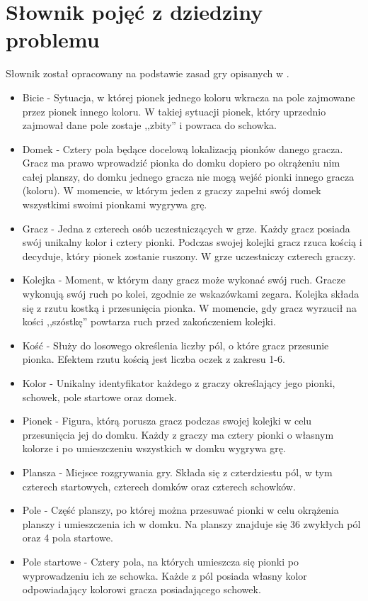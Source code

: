 \documentclass[conference]{IEEEtran}
\begin{document}
\section{Słownik pojęć z dziedziny problemu}
Słownik został opracowany na podstawie zasad gry opisanych w \cite{wiki}.
\begin{itemize}
    \item Bicie - Sytuacja, w której pionek jednego koloru wkracza na pole zajmowane przez pionek innego koloru. W takiej sytuacji pionek, który uprzednio zajmował dane pole zostaje ,,zbity'' i powraca do schowka.
    \item Domek - Cztery pola będące docelową lokalizacją pionków danego gracza. Gracz ma prawo wprowadzić pionka do domku dopiero po okrążeniu nim całej planszy, do domku jednego gracza nie mogą wejść pionki innego gracza (koloru). W momencie, w którym jeden z graczy zapełni swój domek wszystkimi swoimi pionkami wygrywa grę.
    \item Gracz - Jedna z czterech osób uczestniczących w grze. Każdy gracz posiada swój unikalny kolor i cztery pionki. Podczas swojej kolejki gracz rzuca kością i decyduje, który pionek zostanie ruszony. W grze uczestniczy czterech graczy.
    \item Kolejka - Moment, w którym dany gracz może wykonać swój ruch. Gracze wykonują swój ruch po kolei, zgodnie ze wskazówkami zegara. Kolejka składa się z rzutu kostką i przesunięcia pionka. W momencie, gdy gracz wyrzucił na kości ,,szóstkę'' powtarza ruch przed zakończeniem kolejki.
    \item Kość - Służy do losowego określenia liczby pól, o które gracz przesunie pionka. Efektem rzutu kością jest liczba oczek z zakresu 1-6.
    \item Kolor - Unikalny identyfikator każdego z graczy określający jego pionki, schowek, pole startowe oraz domek.
    \item Pionek - Figura, którą porusza gracz podczas swojej kolejki w celu przesunięcia jej do domku. Każdy z graczy ma cztery pionki o własnym kolorze i po umieszczeniu wszystkich w domku wygrywa grę.
    \item Plansza - Miejsce rozgrywania gry. Składa się z czterdziestu pól, w tym czterech startowych, czterech domków oraz czterech schowków.
    \item Pole - Część planszy, po której można przesuwać pionki w celu okrążenia planszy i umieszczenia ich w domku. Na planszy znajduje się 36 zwykłych pól oraz 4 pola startowe.
    \item Pole startowe - Cztery pola, na których umieszcza się pionki po wyprowadzeniu ich ze schowka. Każde z pól posiada własny kolor odpowiadający kolorowi gracza posiadającego schowek.

\end{itemize}
\end{document}
